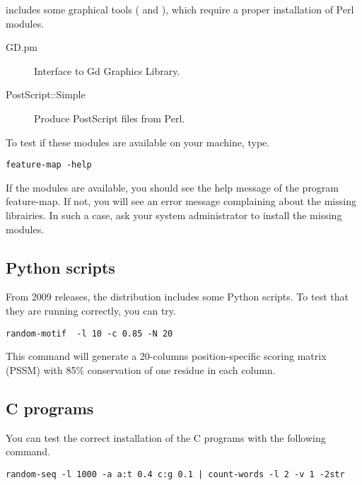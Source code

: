 \documentclass{book}
\begin{document}
\RSAT includes some graphical tools ( and
), which require a proper installation of Perl
modules.

\begin{description}
\item[GD.pm] Interface to Gd Graphics Library.
\item[PostScript::Simple]  Produce PostScript files from Perl.
\end{description}

To test if these modules are available on your machine, type.

\begin{footnotesize}
\begin{verbatim}
feature-map -help
\end{verbatim}
\end{footnotesize}

If the modules are available, you should see the help message of the
program feature-map. If not, you will see an error message complaining
about the missing librairies. In such a case, ask your system
administrator to install the missing modules.

\subsection{Python scripts}

From 2009 releases, the \RSAT distribution includes some Python
scripts. To test that they are running correctly, you can try.

\begin{footnotesize}
\begin{verbatim}
random-motif  -l 10 -c 0.85 -N 20
\end{verbatim}
\end{footnotesize}

This command will generate a 20-columns position-specific scoring
matrix (PSSM) with 85\% conservation of one residue in each column.

\subsection{C programs}

You can test the correct installation of the C programs with the
following command.

\begin{footnotesize}
\begin{verbatim}
random-seq -l 1000 -a a:t 0.4 c:g 0.1 | count-words -l 2 -v 1 -2str
\end{verbatim}
\end{footnotesize}
\end{document}
